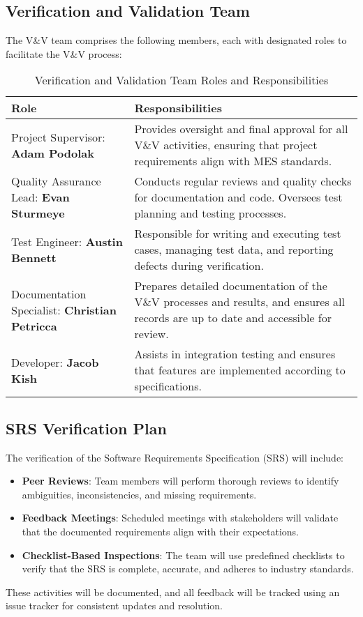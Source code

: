 \documentclass[12pt, titlepage]{article}
\begin{document}
\subsection{Verification and Validation Team}
The V\&V team comprises the following members, each with designated roles to facilitate the V\&V process:

\begin{table}[h!]
\centering
\begin{tabularx}{\textwidth}{|l|X|}
\hline
\textbf{Role} & \textbf{Responsibilities} \\
\hline
Project Supervisor: \textbf{Adam Podolak} & Provides oversight and final approval for all V\&V activities, ensuring that project requirements align with MES standards. \\
\hline
Quality Assurance Lead: \textbf{Evan Sturmeye} & Conducts regular reviews and quality checks for documentation and code. Oversees test planning and testing processes. \\
\hline
Test Engineer: \textbf{Austin Bennett} & Responsible for writing and executing test cases, managing test data, and reporting defects during verification. \\
\hline
Documentation Specialist: \textbf{Christian Petricca} & Prepares detailed documentation of the V\&V processes and results, and ensures all records are up to date and accessible for review. \\
\hline
Developer: \textbf{Jacob Kish} & Assists in integration testing and ensures that features are implemented according to specifications. \\
\hline
\end{tabularx}
\caption{Verification and Validation Team Roles and Responsibilities}
\end{table}

\subsection{SRS Verification Plan}
The verification of the Software Requirements Specification (SRS) will include:
\begin{itemize}
    \item \textbf{Peer Reviews}: Team members will perform thorough reviews to identify ambiguities, inconsistencies, and missing requirements.
    \item \textbf{Feedback Meetings}: Scheduled meetings with stakeholders will validate that the documented requirements align with their expectations.
    \item \textbf{Checklist-Based Inspections}: The team will use predefined checklists to verify that the SRS is complete, accurate, and adheres to industry standards.
\end{itemize}
These activities will be documented, and all feedback will be tracked using an issue tracker for consistent updates and resolution.
\end{document}
